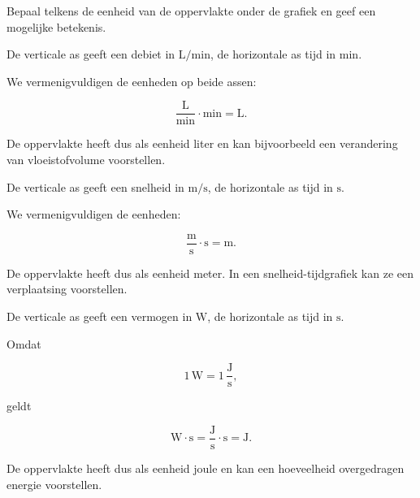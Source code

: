 \documentclass{ximera}
\begin{document}




\begin{oefening}{\oefU\ESS}

Bepaal telkens de eenheid van de oppervlakte onder de grafiek en geef
een mogelijke betekenis.

\begin{question}
De verticale as geeft een debiet in \(\mathrm{L/min}\), de horizontale
as tijd in \(\mathrm{min}\).

\begin{oplossing}

We vermenigvuldigen de eenheden op beide assen:

\[
\frac{\mathrm L}{\mathrm{min}}\cdot\mathrm{min}
=
\mathrm L.
\]

De oppervlakte heeft dus als eenheid liter en kan bijvoorbeeld een
verandering van vloeistofvolume voorstellen.

\end{oplossing}
\end{question}

\begin{question}
De verticale as geeft een snelheid in \(\mathrm{m/s}\), de horizontale
as tijd in \(\mathrm s\).

\begin{oplossing}

We vermenigvuldigen de eenheden:

\[
\frac{\mathrm m}{\mathrm s}\cdot\mathrm s
=
\mathrm m.
\]

De oppervlakte heeft dus als eenheid meter. In een
snelheid-tijdgrafiek kan ze een verplaatsing voorstellen.

\end{oplossing}
\end{question}

\begin{question}
De verticale as geeft een vermogen in \(\mathrm W\), de horizontale
as tijd in \(\mathrm s\).

\begin{oplossing}

Omdat

\[
1\,\mathrm W=1\,\frac{\mathrm J}{\mathrm s},
\]

geldt

\[
\mathrm W\cdot\mathrm s
=
\frac{\mathrm J}{\mathrm s}\cdot\mathrm s
=
\mathrm J.
\]

De oppervlakte heeft dus als eenheid joule en kan een hoeveelheid
overgedragen energie voorstellen.

\end{oplossing}
\end{question}

\end{oefening}
\end{document}
